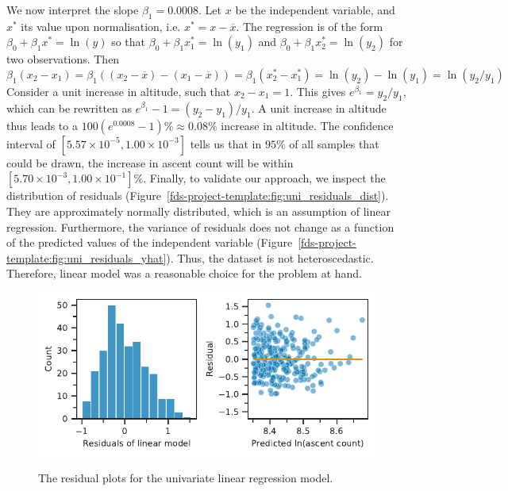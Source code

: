\documentclass[11pt,a4paper]{article}
\begin{document}
We now interpret the slope $\beta_1=0.0008$. Let $x$ be the independent variable, and $x^*$ its value upon normalisation, i.e. $x^*=x-\overline{x}$. The regression is of the form $\beta_0 + \beta_1x^* = \ln(y)$ so that $\beta_0 + \beta_1x_1^* = \ln(y_1)$ and $\beta_0 + \beta_1x_2^* = \ln(y_2)$ for two observations. Then
$$\beta_1(x_2 - x_1) = \beta_1\left((x_2 - \overline{x}) - (x_1 - \overline{x})\right) = \beta_1(x_2^* - x_1^*)  = \ln(y_2) - \ln(y_1) = \ln(y_2 / y_1)$$
Consider a unit increase in altitude, such that $x_2-x_1=1$. This gives $e^{\beta_1} = y_2 / y_1$, which can be rewritten as $e^{\beta_1} - 1 = (y_2 - y_1) / y_1$. A unit increase in altitude thus leads to a $100(e^{0.0008} - 1)\% \approx 0.08\%$ increase in altitude. The confidence interval of $[5.57 \times 10^{-5}, 1.00\times10^{-3}]$ tells us that in $95\%$ of all samples that could be drawn, the increase in ascent count will be within $[5.70\times10^{-3}, 1.00\times10^{-1}]\%$.
Finally, to validate our approach, we inspect the distribution of residuals (Figure~\ref{fds-project-template:fig:uni_residuals_dist}). They are approximately normally distributed, which is an assumption of linear regression. Furthermore, the variance of residuals does not change as a function of the predicted values of the independent variable (Figure~\ref{fds-project-template:fig:uni_residuals_yhat}). Thus, the dataset is not heteroscedastic. Therefore, linear model was a reasonable choice for the problem at hand.
\begin{figure} [h!]
    \centering
    \includegraphics{report/uni_residuals.pdf}
    \begin{minipage}[t]{.5\linewidth}
        \centering
        \label{fds-project-template:fig:uni_residuals_dist}
    \end{minipage}%
    \begin{minipage}[t]{.5\linewidth}
        \centering
        \label{fds-project-template:fig:uni_residuals_yhat}
    \end{minipage}
    \caption{The residual plots for the univariate linear regression model.}
    \label{fds-project-template:fig:uni_residuals}
\end{figure}
\end{document}
